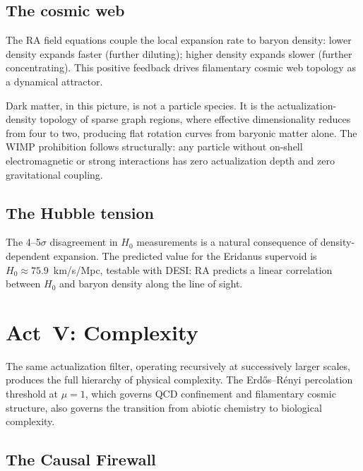 \documentclass[11pt,a4paper]{article}
\theoremstyle{plain}
\theoremstyle{definition}
\theoremstyle{remark}
\begin{document}
\subsection{The cosmic web}\label{sec:web}

The RA field equations couple the local expansion rate to baryon density:
lower density expands faster (further diluting); higher density expands
slower (further concentrating).  This positive feedback drives
filamentary cosmic web topology as a dynamical attractor.

Dark matter, in this picture, is not a particle species.  It is the
actualization-density topology of sparse graph regions, where effective
dimensionality reduces from four to two, producing flat rotation curves
from baryonic matter alone.  The WIMP prohibition follows structurally:
any particle without on-shell electromagnetic or strong interactions has
zero actualization depth and zero gravitational coupling.

\subsection{The Hubble tension}\label{sec:hubble}

The 4--5$\sigma$ disagreement in $H_0$ measurements is a natural
consequence of density-dependent expansion.  The predicted value for the
Eridanus supervoid is $H_0 \approx 75.9$~km/s/Mpc, testable with DESI:
RA predicts a linear correlation between $H_0$ and baryon density along
the line of sight.

\section{Act~V: Complexity}\label{sec:act5}

The same actualization filter, operating recursively at successively
larger scales, produces the full hierarchy of physical complexity.  The
Erd\H{o}s--R\'enyi percolation threshold at $\mu = 1$, which governs QCD
confinement and filamentary cosmic structure, also governs the transition
from abiotic chemistry to biological complexity.

\subsection{The Causal Firewall}\label{sec:firewall}
\end{document}
